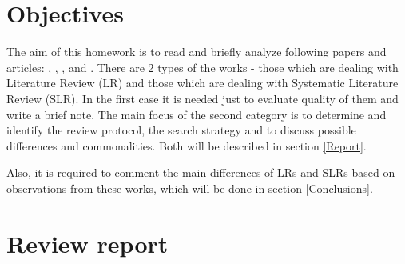 \section*{Objectives}

The aim of this homework is to read and briefly analyze following papers and articles: \cite{LR1}, \cite{LR2}, \cite{LR3}, \cite{SLR1} and \cite{SLR2}. There are 2 types of the works - those which are dealing with Literature Review (LR) and those which are dealing with Systematic Literature Review (SLR). In the first case it is needed just to evaluate quality of them and write a brief note. The main focus of the second category is to determine and identify the review protocol, the search strategy and to discuss possible differences and commonalities. Both will be described in section \ref{Report}.

Also, it is required to comment the main differences of LRs and SLRs based on observations from these works, which will be done in section \ref{Conclusions}.

\section*{Review report}\label{Report}
